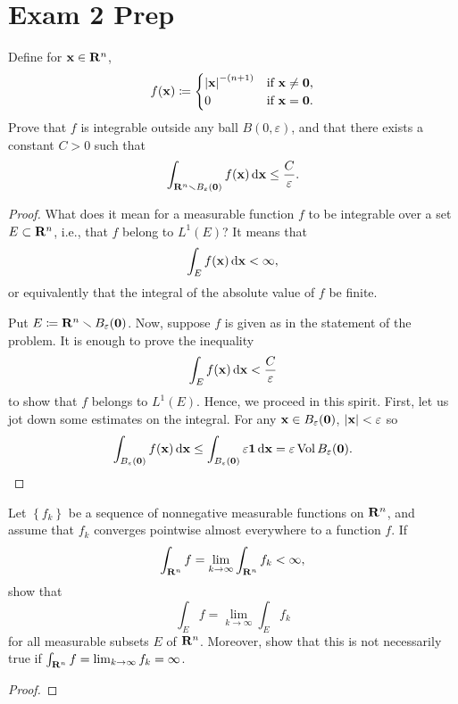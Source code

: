 \section{Exam 2 Prep}
\begin{problem}
Define for $\mathbf{x}\in\mathbf{R}^n$,
\[
f(\mathbf{x})\coloneqq
\begin{cases}
\left|\mathbf{x}\right|^{-(n+1)}&\text{if $\mathbf{x}\neq \mathbf{0}$,}\\
0&\text{if $\mathbf{x}=\mathbf{0}$.}
\end{cases}
\]
Prove that $f$ is integrable outside any ball $B(0,\varepsilon)$, and that
there exists a constant $C>0$ such that
\[
\int_{\mathbf{R}^n\smallsetminus B_\varepsilon(\mathbf{0})}f(\mathbf{x})\mathop{}\!\mathrm{d}\mathbf{x}\leq\frac{C}{\varepsilon}.
\]
\end{problem}
\begin{proof}
What does it mean for a measurable function $f$ to be integrable over a set
$E\subset\mathbf{R}^n$, i.e., that $f$ belong to $L^1(E)$? It means that
\[
\int_E f(\mathbf{x})\mathop{}\!\mathrm{d}\mathbf{x}<\infty,
\]
or equivalently that the integral of the absolute value of $f$ be
finite.

Put $E\coloneqq\mathbf{R}^n\smallsetminus B_\varepsilon(\mathbf{0})$. Now, suppose $f$ is
given as in the statement of the problem. It is enough to prove the
inequality
\begin{equation}
  \label{eq:given-inequality-1}
\int_E f(\mathbf{x})\mathop{}\!\mathrm{d}\mathbf{x}<\frac{C}{\varepsilon}
\end{equation}
to show that $f$ belongs to $L^1(E)$. Hence, we proceed in this
spirit. First, let us jot down some estimates on the integral. For any
$\mathbf{x}\in B_\varepsilon(\mathbf{0})$, $|\mathbf{x}|<\varepsilon$ so
\[
\int_{B_\varepsilon(\mathbf{0})} f(\mathbf{x})\mathop{}\!\mathrm{d}\mathbf{x}\leq
\int_{B_\varepsilon(\mathbf{0})}\varepsilon\mathbf{1}\mathop{}\!\mathrm{d}\mathbf{x}=
\varepsilon\operatorname{Vol} B_\varepsilon(\mathbf{0}).
\]
\end{proof}

\begin{problem}
Let $\left\{f_k\right\}$ be a sequence of nonnegative measurable functions
on $\mathbf{R}^n$, and assume that $f_k$ converges pointwise almost everywhere to
a function $f$. If
\[
\int_{\mathbf{R}^n} f=\lim_{k\to\infty}\int_{\mathbf{R}^n} f_k<\infty,
\]
show that
\[
\int_E f=\lim_{k\to\infty}\int_E f_k
\]
for all measurable subsets $E$ of $\mathbf{R}^n$. Moreover, show that this is not
necessarily true if $\int_{\mathbf{R}^n} f=\lim_{k\to\infty} f_k=\infty$.
\end{problem}
\begin{proof}
\end{proof}

